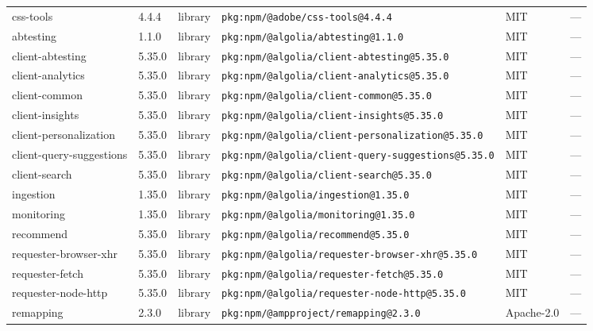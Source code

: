 \documentclass[11pt,a4paper]{article}
\begin{document}
\begin{longtable}{|p{4cm}|p{2cm}|p{1.6cm}|p{5cm}|p{1.5cm}|p{3.5cm}|}
\raggedright css-tools & 4.4.4 & library & \small\texttt{pkg:npm/@adobe/css-tools@4.4.4} & MIT & \small — \\
\raggedright abtesting & 1.1.0 & library & \small\texttt{pkg:npm/@algolia/abtesting@1.1.0} & MIT & \small — \\
\raggedright client-abtesting & 5.35.0 & library & \small\texttt{pkg:npm/@algolia/client-abtesting@5.35.0} & MIT & \small — \\
\raggedright client-analytics & 5.35.0 & library & \small\texttt{pkg:npm/@algolia/client-analytics@5.35.0} & MIT & \small — \\
\raggedright client-common & 5.35.0 & library & \small\texttt{pkg:npm/@algolia/client-common@5.35.0} & MIT & \small — \\
\raggedright client-insights & 5.35.0 & library & \small\texttt{pkg:npm/@algolia/client-insights@5.35.0} & MIT & \small — \\
\raggedright client-personalization & 5.35.0 & library & \small\texttt{pkg:npm/@algolia/client-personalization@5.35.0} & MIT & \small — \\
\raggedright client-query-suggestions & 5.35.0 & library & \small\texttt{pkg:npm/@algolia/client-query-suggestions@5.35.0} & MIT & \small — \\
\raggedright client-search & 5.35.0 & library & \small\texttt{pkg:npm/@algolia/client-search@5.35.0} & MIT & \small — \\
\raggedright ingestion & 1.35.0 & library & \small\texttt{pkg:npm/@algolia/ingestion@1.35.0} & MIT & \small — \\
\raggedright monitoring & 1.35.0 & library & \small\texttt{pkg:npm/@algolia/monitoring@1.35.0} & MIT & \small — \\
\raggedright recommend & 5.35.0 & library & \small\texttt{pkg:npm/@algolia/recommend@5.35.0} & MIT & \small — \\
\raggedright requester-browser-xhr & 5.35.0 & library & \small\texttt{pkg:npm/@algolia/requester-browser-xhr@5.35.0} & MIT & \small — \\
\raggedright requester-fetch & 5.35.0 & library & \small\texttt{pkg:npm/@algolia/requester-fetch@5.35.0} & MIT & \small — \\
\raggedright requester-node-http & 5.35.0 & library & \small\texttt{pkg:npm/@algolia/requester-node-http@5.35.0} & MIT & \small — \\
\raggedright remapping & 2.3.0 & library & \small\texttt{pkg:npm/@ampproject/remapping@2.3.0} & Apache-2.0 & \small — \\

\end{longtable}
\end{document}
